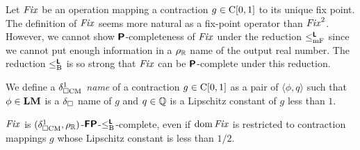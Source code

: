 \documentclass[envcountsame,orivec,oribibl]{llncs}
\begin{document}
Let $\mathit{Fix}$ be an operation mapping a contraction $g \in \mathrm C[0,1]$ 
to its unique fix point.
The definition of $\mathit{Fix}$ seems more natural as a fix-point operator than
$\mathit{Fix}^2$.
However, we cannot show $\text{\bfseries \sffamily \upshape P}$-completeness of $\mathit{Fix}$ 
under the reduction $\leq _{\mathrm{mF}} ^{\text{\bfseries \sffamily \upshape L}}$ since we cannot put enough information in
 a $\rho _\mathbb R$ name of the output real number.
The reduction $\leq _{\mathrm B} ^{\text{\bfseries \sffamily \upshape L}}$ is so strong that $\mathit{Fix}$ can 
be $\text{\bfseries \sffamily \upshape P}$-complete under this reduction.

We define a \emph{$\delta _{\square \mathrm{CM}}^1$ name} of a contraction $g \in \mathrm C[0,1]$
as a pair of $\langle \phi, q \rangle$ such that $\phi \in \mathbf{LM}$ is a 
$\delta _\square$ name of $g$ and $q \in \mathbb Q$ is a Lipschitz constant of $g$ less than $1$.
\begin{lemma}
\label{lemma:P-hard-g_u}
$\mathit{Fix}$ is $(\delta _{\square \mathrm{CM}}^1, \rho _\mathbb R)$-$\text{\bfseries \sffamily \upshape FP}$-$\leq _{\mathrm B} ^{\text{\bfseries \sffamily \upshape L}}$-complete, 
 even if $\mathop{\rm dom} \mathit{Fix}$ is restricted to contraction mappings
$g$ whose Lipschitz constant is less than $1/2$.
\end{lemma}
\end{document}
